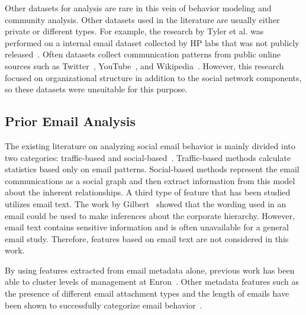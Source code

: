 \documentclass[12pt]{report}
\begin{document}
Other datasets for analysis are rare in this vein of behavior modeling and community analysis.
Other datasets used in the literature are usually either private or different types.
For example, the research by Tyler et al. was performed on a internal email dataset collected by HP labs that was not publicly released~\cite{tyler_email_2003}.
Often datasets collect communication patterns from public online sources such as Twitter~\cite{Zafarani+Liu:2009}, YouTube~\cite{mislove-2007-socialnetworks},  and Wikipedia~\cite{leskovec2010predicting}.
However, this research focused on organizational structure in addition to the social network components, so these datasets were unsuitable for this purpose.

\subsection{Prior Email Analysis} \label{sec:priorAnalysis}
The existing literature on analyzing social email behavior is mainly divided into two categories: traffic-based and social-based~\cite{tang_email_2013}.
Traffic-based methods calculate statistics based only on email patterns.
Social-based methods represent the email communications as a social graph and then extract information from this model about the inherent relationships.
A third type of feature that has been studied utilizes email text.
The work by Gilbert~\cite{gilbert_phrases_2012} showed that the wording used in an email could be used to make inferences about the corporate hierarchy.
However, email text contains sensitive information and is often unavailable for a general email study.
Therefore, features based on email text are not considered in this work.


By using features extracted from email metadata alone, previous work has been able to cluster levels of management at Enron~\cite{yelupula_social_2008}.
Other metadata features such as the presence of different email attachment types and the length of emails have been shown to successfully categorize email behavior~\cite{martin_analyzing_2005}.
\end{document}
